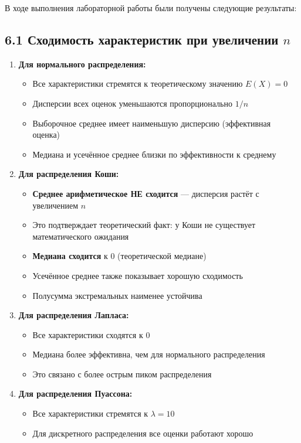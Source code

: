 \documentclass[a4paper,14pt]{extarticle}
\begin{document}
В ходе выполнения лабораторной работы были получены следующие результаты:

\subsection*{6.1 Сходимость характеристик при увеличении $n$}

\begin{enumerate}
    \item \textbf{Для нормального распределения:}
    \begin{itemize}
        \item Все характеристики стремятся к теоретическому значению $E(X) = 0$
        \item Дисперсии всех оценок уменьшаются пропорционально $1/n$
        \item Выборочное среднее имеет наименьшую дисперсию (эффективная оценка)
        \item Медиана и усечённое среднее близки по эффективности к среднему
    \end{itemize}
    
    \item \textbf{Для распределения Коши:}
    \begin{itemize}
        \item \textbf{Среднее арифметическое НЕ сходится} — дисперсия растёт с увеличением $n$
        \item Это подтверждает теоретический факт: у Коши не существует математического ожидания
        \item \textbf{Медиана сходится} к 0 (теоретической медиане)
        \item Усечённое среднее также показывает хорошую сходимость
        \item Полусумма экстремальных наименее устойчива
    \end{itemize}
    
    \item \textbf{Для распределения Лапласа:}
    \begin{itemize}
        \item Все характеристики сходятся к 0
        \item Медиана более эффективна, чем для нормального распределения
        \item Это связано с более острым пиком распределения
    \end{itemize}
    
    \item \textbf{Для распределения Пуассона:}
    \begin{itemize}
        \item Все характеристики стремятся к $\lambda = 10$
        \item Для дискретного распределения все оценки работают хорошо
    \end{itemize}
    

\end{enumerate}
\end{document}
